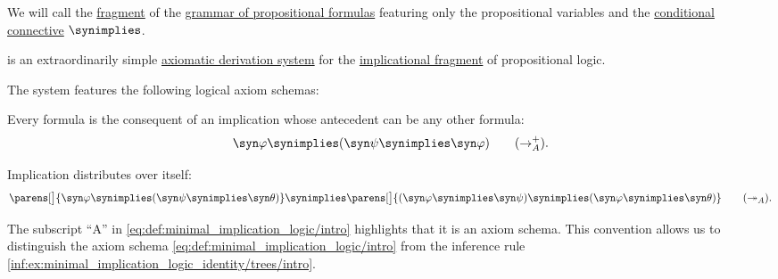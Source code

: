 \begin{definition}\label{def:implicational_propositional_fragment}
  We will call  the \hyperref[con:syntax_fragment]{fragment} of the \hyperref[def:propositional_formula]{grammar of propositional formulas} featuring only the propositional variables and the \hyperref[def:propositional_alphabet/connectives/conditional]{conditional connective} \( \synimplies \).
\end{definition}

\begin{definition}\label{def:minimal_implication_logic}
   is an extraordinarily simple \hyperref[def:propositional_axiomatic_derivation_system]{axiomatic derivation system} for the \hyperref[def:implicational_propositional_fragment]{implicational fragment} of propositional logic.

  The system features the following logical axiom schemas:
  \begin{thmenum}
     Every formula is the consequent of an implication whose antecedent can be any other formula:
    \begin{equation}\label{eq:def:minimal_implication_logic/intro}
      \syn\varphi \synimplies (\syn\psi \synimplies \syn\varphi) \tag{\( \rightarrow_A^+ \)}.
    \end{equation}

     Implication distributes over itself:
    \begin{equation}\label{eq:def:minimal_implication_logic/dist}
      \parens[\big]{ \syn\varphi \synimplies (\syn\psi \synimplies \syn\theta) } \synimplies \parens[\big]{ (\syn\varphi \synimplies \syn\psi) \synimplies (\syn\varphi \synimplies \syn\theta)} \tag{\( \twoheadrightarrow_A \)}.
    \end{equation}
  \end{thmenum}
\end{definition}
\begin{comments}
  \item The subscript \enquote{A} in \eqref{eq:def:minimal_implication_logic/intro} highlights that it is an axiom schema. This convention allows us to distinguish the axiom schema \eqref{eq:def:minimal_implication_logic/intro} from the inference rule \ref{inf:ex:minimal_implication_logic_identity/trees/intro}.
\end{comments}

